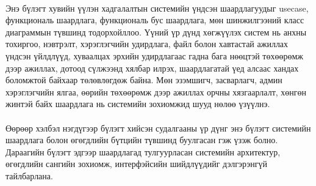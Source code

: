






\paragraph{}
Энэ бүлэгт хувийн үүлэн хадгалалтын системийн үндсэн шаардлагуудыг usecase, функциональ шаардлага, функциональ бус шаардлага, мөн шинжилгээний класс диаграммын түвшинд тодорхойллоо. Үүний үр дүнд хөгжүүлэх систем нь анхны тохиргоо, нэвтрэлт, хэрэглэгчийн удирдлага, файл болон хавтастай ажиллах үндсэн үйлдлүүд, хуваалцах эрхийн удирдлагаас гадна бага нөөцтэй төхөөрөмж дээр ажиллах, дотоод сүлжээнд хялбар илрэх, шаардлагатай үед алсаас хандах боломжтой байхаар төлөвлөгдөж байна. Мөн эзэмшигч, засварлагч, админ хэрэглэгчийн ялгаа, өөрийн төхөөрөмж дээр ажиллах орчны хязгаарлалт, хөнгөн жинтэй байх шаардлага нь системийн зохиомжид шууд нөлөө үзүүлнэ.

\paragraph{}
Өөрөөр хэлбэл нэгдүгээр бүлэгт хийсэн судалгааны үр дүнг энэ бүлэгт системийн шаардлага болон өгөгдлийн бүтцийн түвшинд буулгасан гэж үзэж болно. Дараагийн бүлэгт эдгээр шаардлагад тулгуурласан системийн архитектур, өгөгдлийн сангийн зохиомж, интерфэйсийн шийдлүүдийг дэлгэрэнгүй тайлбарлана.
